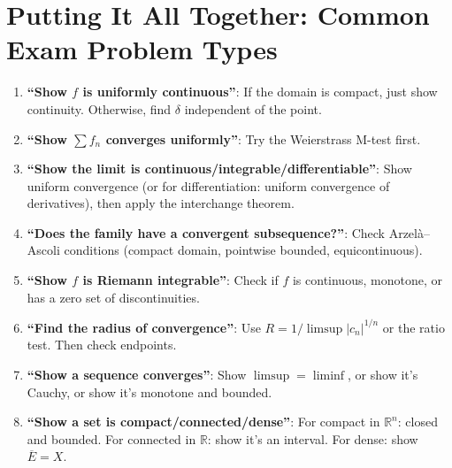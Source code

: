 \documentclass[11pt]{article}
\newcommand{\R}{\mathbb{R}}
\theoremstyle{definition}
\begin{document}
\section{Putting It All Together: Common Exam Problem Types}

\begin{enumerate}
\item \textbf{``Show $f$ is uniformly continuous''}: If the domain is compact, just show continuity. Otherwise, find $\delta$ independent of the point.

\item \textbf{``Show $\sum f_n$ converges uniformly''}: Try the Weierstrass M-test first.

\item \textbf{``Show the limit is continuous/integrable/differentiable''}: Show uniform convergence (or for differentiation: uniform convergence of derivatives), then apply the interchange theorem.

\item \textbf{``Does the family have a convergent subsequence?''}: Check Arzel\`a--Ascoli conditions (compact domain, pointwise bounded, equicontinuous).

\item \textbf{``Show $f$ is Riemann integrable''}: Check if $f$ is continuous, monotone, or has a zero set of discontinuities.

\item \textbf{``Find the radius of convergence''}: Use $R = 1/\limsup|c_n|^{1/n}$ or the ratio test. Then check endpoints.

\item \textbf{``Show a sequence converges''}: Show $\limsup = \liminf$, or show it's Cauchy, or show it's monotone and bounded.

\item \textbf{``Show a set is compact/connected/dense''}: For compact in $\R^n$: closed and bounded. For connected in $\R$: show it's an interval. For dense: show $\overline{E} = X$.
\end{enumerate}
\end{document}
